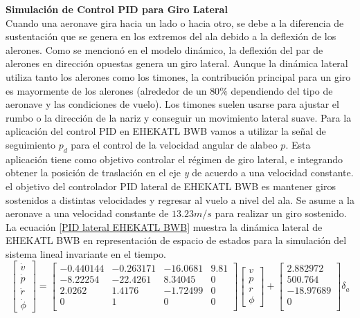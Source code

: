 \medskip

\textbf{Simulación de Control PID para Giro Lateral}\\
Cuando una aeronave gira hacia un lado o hacia otro, se debe a la diferencia de sustentación que se genera en los extremos del ala debido a la deflexión de los alerones. 
Como se mencionó en el modelo dinámico, la deflexión del par de alerones en dirección opuestas genera un giro lateral. 
Aunque la dinámica lateral utiliza tanto los alerones como los timones, la contribución principal para un giro es mayormente de los alerones (alrededor de un $80\%$ dependiendo del tipo de aeronave y las condiciones de vuelo). Los timones suelen usarse para ajustar el rumbo o la dirección de la nariz y conseguir un movimiento lateral suave. 
Para la aplicación del control PID en EHEKATL BWB vamos a utilizar la señal de seguimiento $p_d$ para el control de la velocidad angular de alabeo $p$. 
Esta aplicación tiene como objetivo controlar el régimen de giro lateral, e integrando obtener la posición de traslación en el eje \textit{y} de acuerdo a una velocidad constante. 
el objetivo del controlador PID lateral de EHEKATL BWB es mantener giros sostenidos a distintas velocidades y regresar al vuelo a nivel del ala. 
Se asume a la aeronave a una  velocidad constante de $13.23 m/s$ para realizar un giro sostenido.
La ecuación \ref{PID lateral EHEKATL BWB} muestra la dinámica lateral de EHEKATL BWB en representación de espacio de estados para la simulación del sistema lineal invariante en el tiempo. 
\begin{equation}
\label{PID lateral EHEKATL BWB}
    \begin{bmatrix}
        \dot v \\
        \dot p \\
        \dot r \\
        \dot \phi
    \end{bmatrix}
    =
    \begin{bmatrix}
    -0.440144 & -0.263171 & -16.0681 & 9.81 \\
    -8.22254 & -22.4261 & 8.34045 & 0 \\
    2.0262 & 1.4176 &-1.72499 & 0 \\
    0 & 1 & 0 & 0 \\
    \end{bmatrix}
    \begin{bmatrix}
        v \\
        p \\
        r \\
        \phi
    \end{bmatrix}
    +
    \begin{bmatrix}
    2.882972 \\
    500.764 \\
    -18.97689 \\
    0\\
    \end{bmatrix}
    \delta_a
\end{equation}

